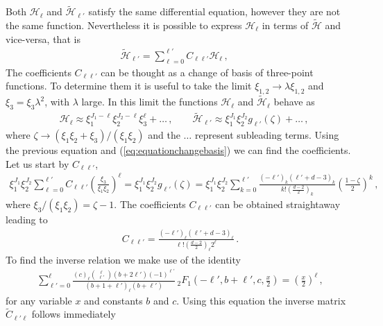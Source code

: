 Both $\mathcal{H}_{\ell}$ and $ \tilde{\mathcal{H}}_{\ell'}$ satisfy the same differential equation, however they are not the same function. Nevertheless
it is possible to express  $\mathcal{H}_{\ell}$ in terms of $\tilde{\mathcal{H}}$ and vice-versa, that is
\begin{align}
   & \tilde{\mathcal{H}}_{\ell'} = \sum_{\ell=0}^{\ell'}  C_{\ell \ell'} \mathcal{H}_{\ell} \,, \qquad
  \label{eq:equationchangebasis}
\end{align}
The coefficients $C_{\ell\ell'}$ can be thought as a change of basis of three-point functions. To determine them it is useful to take the limit $\xi_{1,2}\rightarrow \lambda \xi_{1,2}$ and $\xi_3 =\xi_3 \lambda^2$, with $\lambda$ large. In this limit the functions $\mathcal{H}_{\ell}$ and $\tilde{\mathcal{H}}_{\ell} $ behave as
\begin{align}
   & \mathcal{H}_\ell \approx \xi_1^{J_1-\ell}\xi_2^{J_2-\ell} \xi_3^{\ell} +\dots \,,\qquad
  \tilde{\mathcal{H}}_{\ell'} \approx \xi_1^{J_1}\xi_2^{J_2} g_{\ell'} (\zeta)+\dots\,,
\end{align}
where $\zeta\rightarrow (\xi_1\xi_2+\xi_3)/(\xi_1\xi_2)$ and the $\dots$ represent subleading terms.
Using the previous equation and (\ref{eq:equationchangebasis}) we can find the coefficients.
Let us start by  $C_{\ell\ell'}$,
\begin{align}
  \xi_1^{J_1}\xi_2^{J_2} \sum_{\ell=0}^{\ell'} C_{\ell \ell'}  \left(\frac{\xi_3}{\xi_1\xi_2}\right)^\ell  = \xi_1^{J_1}\xi_2^{J_2}  g_{\ell'} (\zeta) = \xi_1^{J_1}\xi_2^{J_2}  \sum_{k=0}^{\ell'} \frac{\left(-\ell'\right)_k\left(\ell'+d-3\right)_k}{k!\left(\frac{d-2}{2}\right)_k} \left(\frac{1-\zeta}{2}\right)^k \,,
\end{align}
where $\xi_3/(\xi_1\xi_2)=\zeta-1$. The coefficients $C_{\ell\ell'}$ can be obtained straightaway leading to
\begin{align}
  C_{\ell\ell'}=  \frac{\left(-\ell'\right)_\ell\left(\ell'+d-3\right)_\ell}{\ell!\left(\frac{d-2}{2}\right)_\ell 2^{\ell}} \,.
\end{align}
To find the inverse relation we make use of the identity
\begin{align}
  \sum_{\ell'=0}^\ell \frac{(c)_{\ell} {{\ell}\choose{\ell'}} (b+2\ell')(-1)^{\ell'}}{(b+1+\ell')_{\ell} (b+\ell')} \,_2F_1\left(-\ell',b+\ell',c,\frac{x}{2}\right) = \left(\frac{x}{2}\right)^{\ell}\,,
\end{align}
for any variable $x$ and constants $b$ and $c$. Using this  equation  the  inverse matrix  $\tilde{C}_{\ell'\ell}$ follows immediately
